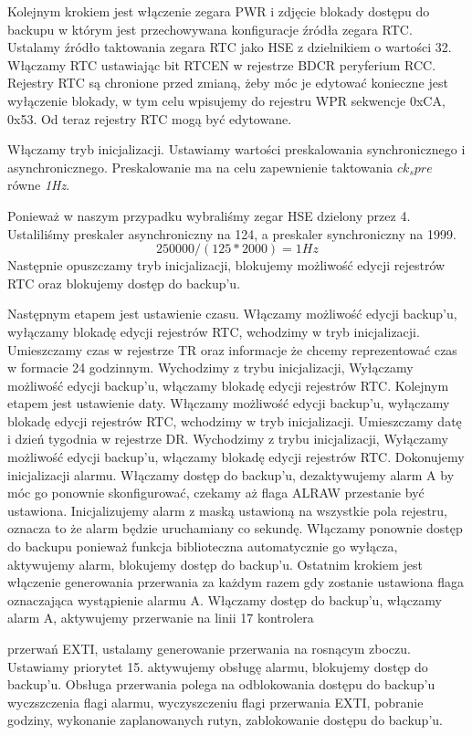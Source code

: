 \documentclass{article}
\begin{document}
Kolejnym krokiem jest włączenie zegara PWR i zdjęcie blokady dostępu do backupu w którym jest
przechowywana konfiguracje źródła zegara RTC.
Ustalamy źródło taktowania zegara RTC jako HSE z dzielnikiem o wartości 32.
Włączamy RTC ustawiając bit RTCEN w rejestrze BDCR peryferium RCC.
Rejestry RTC są chronione przed zmianą, żeby móc je edytować konieczne jest wyłączenie blokady, w
tym celu wpisujemy do rejestru WPR sekwencje 0xCA, 0x53. Od teraz rejestry RTC mogą być
edytowane.

Włączamy tryb inicjalizacji.
Ustawiamy wartości preskalowania synchronicznego i asynchronicznego. Preskalowanie ma na celu 
zapewnienie taktowania $ ck_spre $ równe \emph{1Hz}.

Ponieważ w naszym przypadku wybraliśmy zegar
HSE dzielony przez 4. Ustaliliśmy preskaler asynchroniczny na 124, a preskaler synchroniczny na 1999.
$$ 250000 / (125*2000) = 1Hz $$
Następnie opuszczamy tryb inicjalizacji, blokujemy możliwość edycji rejestrów RTC oraz blokujemy
dostęp do backup’u.

Następnym etapem jest ustawienie czasu. Włączamy możliwość edycji backup’u, wyłączamy blokadę
edycji rejestrów RTC, wchodzimy w tryb inicjalizacji. Umieszczamy czas w rejestrze TR oraz informacje
że chcemy reprezentować czas w formacie 24 godzinnym.
Wychodzimy z trybu inicjalizacji, Wyłączamy możliwość edycji backup’u, włączamy blokadę edycji
rejestrów RTC.
Kolejnym etapem jest ustawienie daty. Włączamy możliwość edycji backup’u, wyłączamy blokadę edycji
rejestrów RTC, wchodzimy w tryb inicjalizacji. Umieszczamy datę i dzień tygodnia w rejestrze DR.
Wychodzimy z trybu inicjalizacji, Wyłączamy możliwość edycji backup’u, włączamy blokadę edycji
rejestrów RTC.
Dokonujemy inicjalizacji alarmu. Włączamy dostęp do backup’u, dezaktywujemy alarm A by móc go
ponownie skonfigurować, czekamy aż flaga ALRAW przestanie być ustawiona.
Inicjalizujemy alarm z maską ustawioną na wszystkie pola rejestru, oznacza to że alarm będzie
uruchamiany co sekundę. Włączamy ponownie dostęp do backupu ponieważ funkcja biblioteczna
automatycznie go wyłącza, aktywujemy alarm, blokujemy dostęp do backup’u.
Ostatnim krokiem jest włączenie generowania przerwania za każdym razem gdy zostanie ustawiona flaga
oznaczająca wystąpienie alarmu A.
Włączamy dostęp do backup’u, włączamy alarm A, aktywujemy przerwanie na linii 17 kontrolera

przerwań EXTI, ustalamy generowanie przerwania na rosnącym zboczu. Ustawiamy priorytet 15.
aktywujemy obsługę alarmu, blokujemy dostęp do backup’u.
Obsługa przerwania polega na odblokowania dostępu do backup’u wyczszczenia flagi alarmu,
wyczyszczeniu flagi przerwania EXTI, pobranie godziny, wykonanie zaplanowanych rutyn,
zablokowanie dostępu do backup’u.
\end{document}
